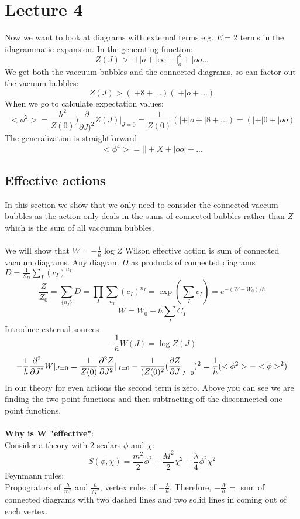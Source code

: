 \documentclass{article}
\begin{document}
\section{Lecture 4}
Now we want to look at diagrams with external terms e.g. $E=2$ terms in the idagrammatic expansion. In the generating function:
$$
Z(J) > | + |o + | \infty + |^o_o + |oo ...
$$
We get both the vaccuum bubbles and the connected diagrams, so can factor out the vacuum bubbles:
$$
Z(J) > (| + 8 + ...)( | + |o + ...)
$$
When we go to calculate expectation values:
$$
< \phi^2 > = \frac{\hbar^2}{Z(0)} )\frac{\partial }{\partial J)^2} Z(J) |_{J=0} = \frac{1}{Z(0)} (| + |o + | 8 + ...) = (| + |0 + |oo)
$$
The generalization is straightforward
$$
< \phi^4 > = || + X + |o o| + ...
$$
\subsection{Effective actions}
In this section we show that we only need to consider the connected vaccum bubbles as the action only deals in the sums of connected bubbles rather than $Z$ which is the sum of all vaccumm bubbles.\\\\
We will show that $W = - \frac{1}{\hbar} \log Z$ Wilson effective action is sum of connected vacuum diagrams. Any diagram $D$ as products of connected diagrams $ D= \frac{1}{S_D}\sum_I(c_I)^{n_I}$
$$
\frac{Z}{Z_0} = \sum_{\{ n_I\}} D = \prod_I \sum_{n_I} (c_I)^{n_I} = \exp ( \sum_I c_I ) = e^{- (W-W_0)/ \hbar}
$$
$$
W= W_0 - \hbar \sum_I C_I
$$
Introduce external sources
$$
- \frac{1}{\hbar} W(J) = \log Z(J)
$$
$$
- \frac{1}{\hbar} \frac{\partial ^2}{\partial J^"} W |_{J=0} = \frac{1}{Z(0)} \frac{\partial^2 Z}{\partial J^2} |_{J=0} - \frac{1}{(Z(0)^2} (\frac{\partial Z}{\partial J}_{J=0} )^2 = \frac{1}{\hbar} ( < \phi^2> -< \phi>^2)
$$
In our theory for even actions the second term is zero. Above you can see we are finding the two point functions and then subtracting off the disconnected one point functions.\\\\
\textbf{Why is W "effective"}:\\
Consider a theory with 2 scalars $\phi$ and $\chi$:
$$
S(\phi, \chi) = \frac{m^2}{2} \phi^2 + \frac{M^2}{2} \chi^2 + \frac{\lambda}{4} \phi^2 \chi^2
$$
Feynmann rules:\\
Propogrators of $\frac{\hbar}{m^2}$ and $\frac{\hbar}{M^2}$, vertex rules of $- \frac{\lambda}{\hbar}$.
Therefore, $- \frac{W}{\hbar} = $ sum of connected diagrams with two dashed lines and two solid lines in coming out of each vertex.
\end{document}
